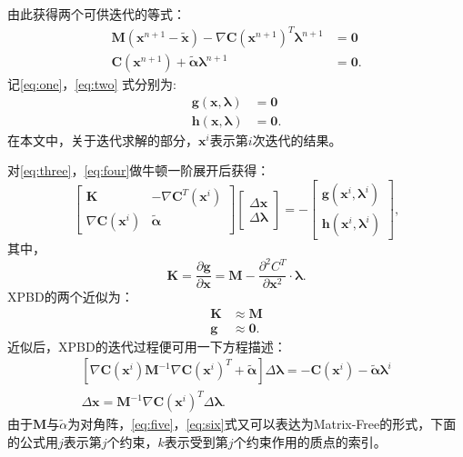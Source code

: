 由此获得两个可供迭代的等式：
\begin{align}
	\mathbf{M}\left(\mathbf{x}^{n+1}-\tilde{\mathbf{x}}\right)-\nabla \mathbf{C}\left(\mathbf{x}^{n+1}\right)^T \boldsymbol{\lambda}^{n+1} & =\mathbf{0} \label{eq:one}  \\
	\mathbf{C}\left(\mathbf{x}^{n+1}\right)+\tilde{\boldsymbol{\alpha}} \boldsymbol{\lambda}^{n+1}                                         & =\mathbf{0}. \label{eq:two}
\end{align}
记\eqref{eq:one}，\eqref{eq:two} 式分别为:
\begin{align}
	\mathbf{g}\left(\mathbf{x}, \boldsymbol{\lambda}\right) & =\mathbf{0} \label{eq:three} \\
	\mathbf{h}\left(\mathbf{x}, \boldsymbol{\lambda}\right) & =\mathbf{0}.\label{eq:four}
\end{align}
在本文中，关于迭代求解的部分，$\mathbf{x}^{i}$表示第$i$次迭代的结果。

对\eqref{eq:three}，\eqref{eq:four}做牛顿一阶展开后获得：
\begin{equation}
	\left[\begin{array}{cc}
			\mathbf{K}                                 & -\nabla \mathbf{C}^T\left(\mathbf{x}^i\right) \\
			\nabla \mathbf{C}\left(\mathbf{x}^i\right) & \tilde{\boldsymbol{\alpha}}
		\end{array}\right]\left[\begin{array}{l}
			\Delta \mathbf{x} \\
			\Delta \boldsymbol{\lambda}
		\end{array}\right]=-\left[\begin{array}{l}
			\mathbf{g}\left(\mathbf{x}^i, \boldsymbol{\lambda}^i\right) \\
			\mathbf{h}\left(\mathbf{x}^i, \boldsymbol{\lambda}^i\right)
		\end{array}\right],
\end{equation}
其中，
\begin{equation}
	\mathbf{K}=\frac{\partial \mathbf{g}}{\partial \mathbf{x}} = \mathbf{M} - \frac{\partial^2 C^T}{\partial \mathbf{x}^2} \cdot \boldsymbol{\lambda}.
\end{equation}
XPBD的两个近似为：
\begin{align}
	\mathbf{K} & \approx \mathbf{M}  \\
	\mathbf{g} & \approx \mathbf{0}.
\end{align}
近似后，XPBD的迭代过程便可用一下方程描述：
\begin{align}
	\left[\nabla \mathbf{C}\left(\mathbf{x}^i\right) \mathbf{M}^{-1} \nabla \mathbf{C}\left(\mathbf{x}^i\right)^T+\tilde{\boldsymbol{\alpha}}\right] \Delta \boldsymbol{\lambda}=-\mathbf{C}\left(\mathbf{x}^i\right)-\tilde{\boldsymbol{\alpha}} \boldsymbol{\lambda}^i \label{eq:five} \\
	\Delta \mathbf{x}=\mathbf{M}^{-1} \nabla \mathbf{C}\left(\mathbf{x}^i\right)^T \Delta \boldsymbol{\lambda} \label{eq:six}.
\end{align}
由于$\mathbf{M}$与$\tilde{\alpha}$为对角阵，\eqref{eq:five}，\eqref{eq:six}式又可以表达为Matrix-Free的形式，下面的公式用$j$表示第$j$个约束，$k$表示受到第$j$个约束作用的质点的索引。

